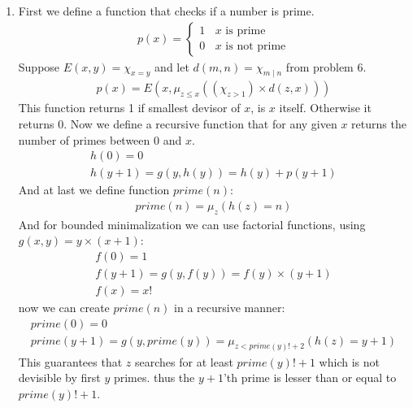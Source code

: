 \begin{enumerate}[label=]
    \item 
    First we define a function that checks if a number is prime.
    \begin{gather*}
        p(x) = \begin{cases}
            1 \ \ \ \ x \text{ is prime} \\
            0 \ \ \ \ x \text{ is not prime}
        \end{cases}
    \end{gather*}
    Suppose $E(x, y) = \chi_{x = y}$ and let $d(m, n) = \chi_{m \mid n}$ from problem 6.
    \begin{gather*}
        p(x) = E(x, \mu_{z \le x}((\chi_{z > 1}) \times d(z, x)))
    \end{gather*}
    This function returns 1 if smallest devisor of $x$, is $x$ itself. Otherwise it returns 0. \newline
    Now we define a recursive function that for any given $x$ returns the number of primes between $0$ and $x$.
    \begin{gather*}
        h(0) = 0 \\
        h(y + 1) = g(y, h(y)) = h(y) + p(y + 1) 
    \end{gather*}
    And at last we define function $prime(n)$:
    \begin{gather*}
        prime(n) = \mu_{z}(h(z) = n)
    \end{gather*}
    And for bounded minimalization we can use factorial functions, using $g(x, y) = y \times (x + 1)$:
    \begin{gather*}
        f(0) = 1 \\
        f(y + 1) = g(y, f(y)) = f(y) \times (y + 1) \\
        f(x) = x!
    \end{gather*}
    now we can create $prime(n)$ in a recursive manner:
    \begin{gather*}
        prime(0) = 0\\
        prime(y + 1) = g(y, prime(y)) = \mu_{z < prime(y)! + 2}(h(z) = y + 1)
    \end{gather*}
    This guarantees that $z$ searches for at least $prime(y)! + 1$ which is not devisible by first $y$ primes.
    thus the $y + 1$'th prime is lesser than or equal to $prime(y)! + 1$.
\end{enumerate}
